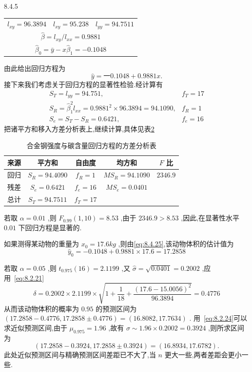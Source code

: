 \begin{example}{}{8.4.5}
\begin{table}[htbp]
\begin{tabular}{ccc}
			$ l_{xy}=96.3894 $ 	&    $ l_{xy}=95.238 $     &  $ l_{yy}=94.7511 $  \\
			\multicolumn{3}{c}{ $ \hat{\beta}=l_{xy}/l_{xx}=0.9881 $ } \\
			\multicolumn{3}{c}{ $ \hat{\beta}_0=\bar{y}-x\hat{\beta}_1=-0.1048 $ } \\
		\end{tabular}%
		\label{tab:8.4.5}%
	\end{table}%
	由此给出回归方程为
	\begin{equation}
	\hat{y}=一0.1048+0.9881x. \label{eq:8.4.25}
	\end{equation}
	接下来我们考虑关于回归方程的显著性检验.经计算有
	\[
	\begin{array}{ll}{S_{T}=l_{y y}=94.751,} & {f_{T}=17} \\ {S_{R}=\hat{\beta}_{1}^{2} l_{x x}=0.9881^{2} \times 96.3894=94.1090,} & {f_{R}=1} \\ {S_{e}=S_{T}-S_{R}=0.6421,} & {f_{e}=16}\end{array}
	\]
	把诸平方和移入方差分析表上,继续计算,具体见表\ref{tab:8.4.6}
	\begin{table}[htbp]
		\centering
		\caption{合金钢强度与碳含量回归方程的方差分析表}
		\begin{tabular}{ccccc}
			\toprule
			来源    &  平方和  & 自由度   & 均方和   & $  F $ 比 \\\midrule %
			回归    &  $ S_R=94.4090 $  & $  f_R=1 $   &  $ MS_R=94.1090 $  &  $ 2346.9 $  \\
			残差    &  $ S_e=0.6421 $  &  $ f_e=16 $  &  $ MS_e=0.0401 $  &  \\\midrule
			总计    &  $ S_T=94.7511 $  &  $ f_T=17 $  &       &  \\\bottomrule
		\end{tabular}%
		\label{tab:8.4.6}%
	\end{table}%
	若取 $ \alpha=0.01 $ ,则 $ F_{0.99}(1,10)=8.53 $ ,由于 $ 2346.9>8.53 $ ,因此,在显著性水平 $ 0.01 $ 下回归方程是显著的.
	
	如果测得某动物的重量为 $ x_0=17.6kg $ ,则由\ref{eq:8.4.25},该动物体积的估计值为
	\[
	\hat{y}_{0}=-0.1048+0.9881 \times 17.6=17.2858
	\]
	
	若取 $ \alpha=0.05 $ ,则 $ t_{0.975}(16)=2.1199 $ ,又 $ \hat{\sigma}=\sqrt{0.0401}=0.2002 $ ,应用~\ref{eq:8.2.21}
	\[
	\delta=0.2002 \times 2.1199 \times \sqrt{1+\frac{1}{18}+\frac{(17.6-15.0056)^{2}}{96.3894}}=0.4776
	\]
	从而该动物体积的概率为 $ 0.95 $ 的预测区间为
	$ (17.2858-0.4776,17.2858\pm 0.4776)=(16.8082,17.7634) $ .
	用~\ref{eq:8.2.24}可以求近似预测区间,由于 $ \mu_{0.975}=1.96 $ ,故有 $ \sigma \sim 1.96\times 0.2002=0.3924 $ ,则所求区间为
	\[
	(17.2858-0.392 4,17.2858\pm 0.3924)=(16.8934,17.6782).
	\]
	此处近似预测区间与精确预测区间差距已不大了,当 $ n $ 更大一些,两者差距会更小一些.
\end{example}

